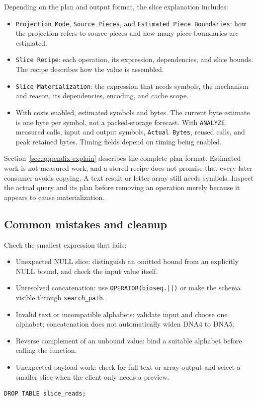 Depending on the plan and output format, the slice explanation includes:
\begin{itemize}
  \item \texttt{Projection Mode}, \texttt{Source Pieces}, and
    \texttt{Estimated Piece Boundaries}: how the projection refers to source
    pieces and how many piece boundaries are estimated.
  \item \texttt{Slice Recipe}: each operation, its expression, dependencies,
    and slice bounds. The recipe describes how the value is assembled.
  \item \texttt{Slice Materialization}: the expression that needs symbols,
    the mechanism and reason, its dependencies, encoding, and cache scope.
  \item With costs enabled, estimated symbols and bytes. The current byte
    estimate is one byte per symbol, not a packed-storage forecast. With
    \texttt{ANALYZE}, measured calls, input and output symbols,
    \texttt{Actual Bytes}, reused calls, and peak retained bytes. Timing
    fields depend on timing being enabled.
\end{itemize}

Section~\ref{sec:appendix-explain} describes the complete plan format.
Estimated work is not measured work, and a stored recipe does not promise
that every later consumer avoids copying. A text result or letter array
still needs symbols. Inspect the actual query and its plan before removing
an operation merely because it appears to cause materialization.

\subsection{Common mistakes and cleanup}

Check the smallest expression that fails:
\begin{itemize}
  \item Unexpected NULL slice: distinguish an omitted bound from an
    explicitly NULL bound, and check the input value itself.
  \item Unresolved concatenation: use \texttt{OPERATOR(bioseq.||)} or
    make the schema visible through \texttt{search\_path}.
  \item Invalid text or incompatible alphabets: validate input and choose
    one alphabet; concatenation does not automatically widen DNA4 to DNA5.
  \item Reverse complement of an unbound value: bind a suitable alphabet
    before calling the function.
  \item Unexpected payload work: check for full text or array output and
    select a smaller slice when the client only needs a preview.
\end{itemize}

\par\noindent\begin{minipage}{\linewidth}
\begin{lstlisting}[style=bioseq-appendix-sql]
DROP TABLE slice_reads;
\end{lstlisting}
\end{minipage}
